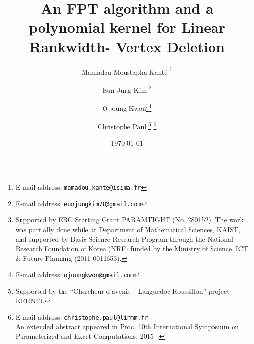 \documentclass[11pt]{article}
\theoremstyle{remark}
\begin{document}
\title{An FPT algorithm and a polynomial kernel for Linear Rankwidth- Vertex Deletion}

\author[1]{Mamadou Moustapha Kant\'e  \thanks{ E-mail address: \texttt{mamadou.kante@isima.fr}}}

\author[2]{Eun Jung Kim  \thanks{ E-mail address: \texttt{eunjungkim78@gmail.com}}}


\author[3]{O-joung Kwon\thanks{Supported by ERC Starting Grant PARAMTIGHT (No. 280152). The work was partially done while at Department of Mathematical Sciences, KAIST, and supported by 
 Basic Science Research
  Program through the National Research Foundation of Korea (NRF)
  funded by  the Ministry of Science, ICT \& Future Planning
  (2011-0011653).}\thanks{E-mail address: \texttt{ojoungkwon@gmail.com}}}

\author[4]{Christophe Paul  
\thanks{Supported by the ``Chercheur d'avenir -- Languedoc-Roussillon'' project KERNEL}
\thanks{E-mail address: \texttt{christophe.paul@lirmm.fr} \\
 An extended abstract appeared in 
  Proc. 10th International Symposium on Parameterized and Exact Computations, 2015~\cite{KanteKKP2015}.}}


\date{\today}




\maketitle
\end{document}
